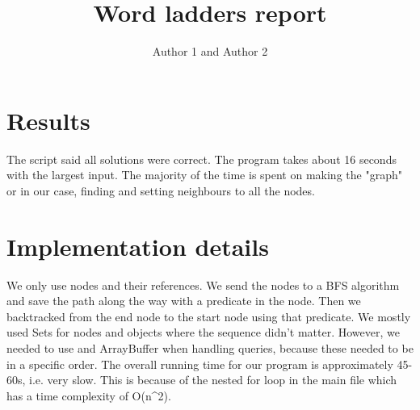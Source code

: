 \documentclass{article}
\title{Word ladders report}
\author{Author 1 and Author 2}
\begin{document}
  \maketitle

  \section{Results}


  The script said all solutions were correct. The program takes about 16 seconds with the largest input. 
  The majority of the time is spent on making the "graph" or in our case, finding and setting neighbours to all the nodes. 

  \section{Implementation details}


  We only use nodes and their references. We send the nodes to a BFS algorithm and save the path along the way with a predicate in the node. 
  Then we backtracked from the end node to the start node using that predicate. We mostly used Sets for nodes and objects where the sequence didn't matter.
  However, we needed to use and ArrayBuffer when handling queries, because these needed to be in a specific order. 
  The overall running time for our program is approximately 45-60s, i.e. very slow. This is because of the nested for loop in the main file 
  which has a time complexity of O(n^2).
\end{document}
